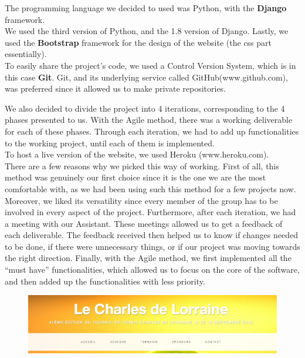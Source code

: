 \documentclass[a4paper, 12pt]{article}
\begin{document}
The programming language we decided to used was Python, with the \textbf{Django} framework.\\

We used the third version of Python, and the 1.8 version of Django. Lastly, we used the \textbf{Bootstrap} framework for the design of the website (the css part essentially). \\

To easily share the project’s code, we used a Control Version System, which is in this case \textbf{Git}. Git, and its underlying service called GitHub(www.github.com), was preferred since it allowed us to make private repositories. 

We also decided to divide the project into 4 iterations, corresponding to the 4 phases presented to us. With the Agile method, there was a working deliverable for each of these phases. Through each iteration, we had to add up functionalities to the working project, until each of them is implemented.  \\

To host a live version of the website, we used Heroku (www.heroku.com).\\

There are a few reasons why we picked this way of working. First of all, this method was genuinely our first choice since it is the one we are the most comfortable with, as we had been using such this method for a few projects now. Moreover, we liked its versatility since every member of the group has to be involved in every aspect of the project. Furthermore, after each iteration, we had a meeting with our Assistant. These meetings allowed us to get a feedback of each deliverable. The feedback received then helped us to know if changes needed to be done, if there were unnecessary things, or if our project was moving towards the right direction. Finally, with the Agile method, we first implemented all the “must have” functionalities, which allowed us to focus on the core of the software, and then added up the functionalities with less priority. \\

\begin{figure}[h]

\includegraphics[scale=0.5]{onglets.png}
\end{figure}
\end{document}

